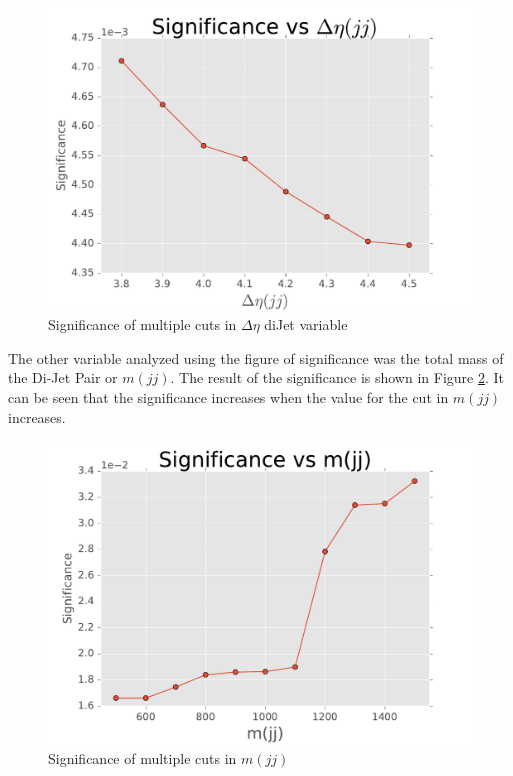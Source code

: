 \begin{figure}[H]
\centering
\includegraphics[width = \linewidth]{significance_deltaEta.pdf}
\caption{Significance of multiple cuts in $\Delta \eta$ diJet variable}
\label{fig: significanceDeltaEta}
\end{figure}

The other variable analyzed using the figure of significance was the total mass of the Di-Jet Pair or $m(jj)$. The result of the significance is shown in Figure \ref{fig: significanceMass}. It can be seen that the significance increases when the value for the cut in $m(jj)$ increases. 

\begin{figure}[H]
\centering
\includegraphics[width = \linewidth]{significance_mass.pdf}
\caption{Significance of multiple cuts in $m(jj)$}
\label{fig: significanceMass}
\end{figure}


